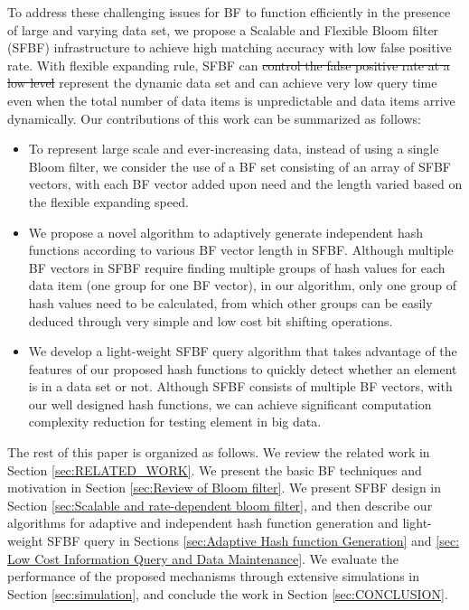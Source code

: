 \documentclass[10pt,journal,compsoc]{IEEEtran}
\newcommand{\rev}[1]{#1}
\newcommand{\del}[1]{\sout{#1}}  %
\begin{document}
To address these challenging issues for BF to function efficiently in the presence of large and varying data set, we propose a Scalable and Flexible Bloom filter (SFBF) infrastructure to achieve high matching accuracy with low false positive rate. \rev{With flexible expanding rule,} SFBF can \del{control the false positive rate at a low level} \rev{represent the dynamic data set } and can achieve very low query time even when the total number of data items is unpredictable and data items arrive dynamically. Our contributions of this work can be summarized as follows:
\begin{itemize}
  \item To represent large scale and ever-increasing data, instead of using a single Bloom filter, we consider the use of a BF set consisting of an array of SFBF vectors, with each BF vector added upon need and the length varied based on the flexible expanding speed.
  \item We propose a novel algorithm to adaptively generate \rev{independent} hash functions according to various BF vector length in SFBF. Although multiple BF vectors in SFBF require finding multiple groups of hash values for each data item (one group for one BF vector), in our algorithm, only one group of hash values need to be calculated, from which other groups can be easily deduced through very simple and low cost bit shifting operations.
  \item We develop a light-weight SFBF query algorithm that takes advantage of the features of our proposed hash functions to quickly detect whether an element is in a data set or not. Although SFBF consists of multiple BF vectors, with our well designed hash functions, we can achieve significant computation complexity reduction for testing element in big data.
\end{itemize}


The rest of this paper is organized as follows. We review the related work in Section \ref{sec:RELATED_WORK}. We present the basic BF techniques and  \rev{motivation} in Section \ref{sec:Review of Bloom filter}. We \rev{present}  SFBF design in Section \ref{sec:Scalable and rate-dependent bloom filter}, and then describe our algorithms for adaptive \rev{and independent} hash function generation and light-weight SFBF query in Sections \ref{sec:Adaptive Hash function Generation} and \ref{sec: Low Cost Information Query and Data Maintenance}.  We evaluate the performance of the proposed mechanisms through extensive simulations in Section \ref{sec:simulation}, and conclude the work in Section \ref{sec:CONCLUSION}.
\end{document}
